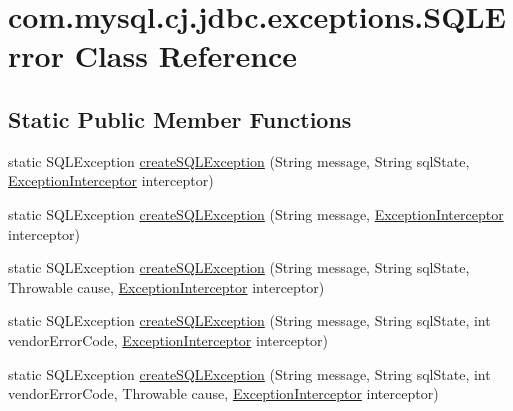 \hypertarget{classcom_1_1mysql_1_1cj_1_1jdbc_1_1exceptions_1_1_s_q_l_error}{}\section{com.\+mysql.\+cj.\+jdbc.\+exceptions.\+S\+Q\+L\+Error Class Reference}
\label{classcom_1_1mysql_1_1cj_1_1jdbc_1_1exceptions_1_1_s_q_l_error}
\subsection*{Static Public Member Functions}
\begin{DoxyCompactItemize}
\item 
static S\+Q\+L\+Exception \mbox{\hyperlink{classcom_1_1mysql_1_1cj_1_1jdbc_1_1exceptions_1_1_s_q_l_error_a4a4abbc46fa81c8180b80d304d6b8cd7}{create\+S\+Q\+L\+Exception}} (String message, String sql\+State, \mbox{\hyperlink{interfacecom_1_1mysql_1_1cj_1_1exceptions_1_1_exception_interceptor}{Exception\+Interceptor}} interceptor)
\item 
static S\+Q\+L\+Exception \mbox{\hyperlink{classcom_1_1mysql_1_1cj_1_1jdbc_1_1exceptions_1_1_s_q_l_error_a4247d542356478b0ebffa130046e2410}{create\+S\+Q\+L\+Exception}} (String message, \mbox{\hyperlink{interfacecom_1_1mysql_1_1cj_1_1exceptions_1_1_exception_interceptor}{Exception\+Interceptor}} interceptor)
\item 
static S\+Q\+L\+Exception \mbox{\hyperlink{classcom_1_1mysql_1_1cj_1_1jdbc_1_1exceptions_1_1_s_q_l_error_a34308dfb92347b11268a7df69a6c49ea}{create\+S\+Q\+L\+Exception}} (String message, String sql\+State, Throwable cause, \mbox{\hyperlink{interfacecom_1_1mysql_1_1cj_1_1exceptions_1_1_exception_interceptor}{Exception\+Interceptor}} interceptor)
\item 
static S\+Q\+L\+Exception \mbox{\hyperlink{classcom_1_1mysql_1_1cj_1_1jdbc_1_1exceptions_1_1_s_q_l_error_a090e5fb59c357636790ec59e0fc60b0e}{create\+S\+Q\+L\+Exception}} (String message, String sql\+State, int vendor\+Error\+Code, \mbox{\hyperlink{interfacecom_1_1mysql_1_1cj_1_1exceptions_1_1_exception_interceptor}{Exception\+Interceptor}} interceptor)
\item 
static S\+Q\+L\+Exception \mbox{\hyperlink{classcom_1_1mysql_1_1cj_1_1jdbc_1_1exceptions_1_1_s_q_l_error_a466ce514f51b53a59840b41bfa37e0cf}{create\+S\+Q\+L\+Exception}} (String message, String sql\+State, int vendor\+Error\+Code, Throwable cause, \mbox{\hyperlink{interfacecom_1_1mysql_1_1cj_1_1exceptions_1_1_exception_interceptor}{Exception\+Interceptor}} interceptor)

\end{DoxyCompactItemize}
